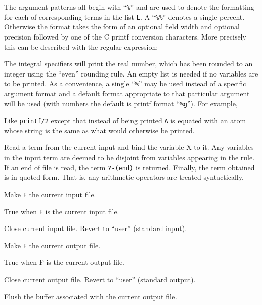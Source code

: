 \begin{description}
The argument patterns all begin with ``{\tt \%}'' and are used to
denote the formatting for each of corresponding terms in the list {\tt L}.
A ``{\tt \%\%}'' denotes a single percent.
Otherwise the format takes the form of an optional field width and optional
precision followed by one of the C printf conversion characters.
More precisely this can be described with the regular expression:

\stuff{\>\%[[-][0-9]*][\ttsl.[0-9]*][fegdoxcus\%]}

\chgbarbegin
The integral specifiers will print the real number, which
has been rounded to an integer using the ``even''
rounding rule.
\chgbarend
An empty list is needed if no variables are to be printed.
As a convenience, a single ``{\tt \%}'' may be used instead of
a specific argument format and a default format appropriate to
that particular argument will be used (with numbers
the default is printf format ``{\tt \%g}''). For example,


\chgbarbegin
{}
Like {\tt printf/2} except that instead of being printed {\tt A}
is equated with an atom whose string is the same as what would otherwise
be printed.
\chgbarend

Read a term from the current input and bind the variable X to it. Any
variables in the input term are deemed to be disjoint from variables appearing
in the rule. If an end of file is read, the term {\tt ?-(end)} is returned.
Finally, the term obtained is in quoted form. 
That is, any arithmetic operators
are treated syntactically. 

Make {\tt F} the current input file.

True when {\tt F} is the current input file.

Close current input file. Revert to ``user'' (standard input).

Make {\tt F} the current output file.

True when F is the current output file.

Close current output file. Revert to ``user'' (standard output).

Flush the buffer associated with the current output file.
\end{description}

